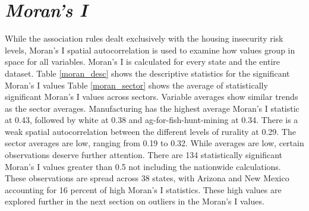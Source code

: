 










\section{\textit{Moran's I}}


While the association rules dealt exclusively with the housing insecurity risk levels, Moran’s I spatial autocorrelation is used to examine how values group in space for all variables. Moran’s I is calculated for every state and the entire dataset.  Table \ref{moran_desc} shows the descriptive statistics for the significant Moran's I values
Table \ref{moran_sector} shows the average of statistically significant Moran's I values across sectors. Variable averages show similar trends as the sector averages. Manufacturing has the highest average Moran's I statistic at 0.43, followed by white at 0.38 and ag-for-fish-hunt-mining at 0.34. There is a weak spatial autocorrelation between the different levels of rurality at 0.29.
The sector averages are low, ranging from 0.19 to 0.32. While averages are low, certain observations deserve further attention. There are 134 statistically significant Moran's I values greater than 0.5 not including the nationwide calculations. These observations are spread across 38 states, with Arizona and New Mexico accounting for 16 percent of high Moran's I statistics. These high values are explored further in the next section on outliers in the Moran's I values. 






%

